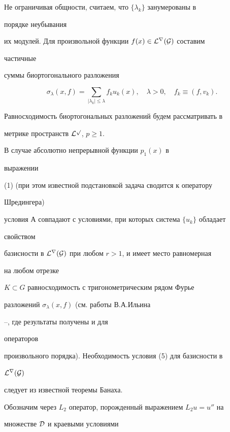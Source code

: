 Не ограничивая общности, считаем, что $\{\lambda_k\}$ занумерованы в


порядке неубывания


их модулей. Для произвольной функции $f(x)\in\cal L^r(G)$ составим


частичные


суммы биортогонального разложения


$$


\sigma_\lambda(x,f)=\sum_{|\lambda_k|\le\lambda}


f_k u_k(x),\quad \lambda>0,\quad


f_k\equiv(f,v_k).


$$


Равносходимость биортогональных разложений будем рассматривать в


метрике пространств $\cal L^p$, $p\ge 1$.





\begin{note} В случае абсолютно непрерывной функции $p_1(x)$ в


выражении


(1) (при этом известной подстановкой задача сводится к оператору


Шредингера)


условия А совпадают с условиями, при которых система $\{u_k\}$ обладает


свойством


базисности в $\cal L^r(G)$ при любом $r>1$, и имеет место равномерная


на любом отрезке


$K\subset G$ равносходимость с тригонометрическим рядом Фурье


разложений $\sigma_\lambda(x,f)$ (см. работы В.А.Ильина


\cite{1}--\cite{4}, где результаты получены и для


операторов


произвольного порядка). Необходимость условия (5) для базисности в


$\cal L^r(G)$


следует из известной теоремы Банаха.


\end{note}





Обозначим через $L_2$ оператор, порожденный выражением $L_2u=u''$ на


множестве $\cal D$ и краевыми условиями


